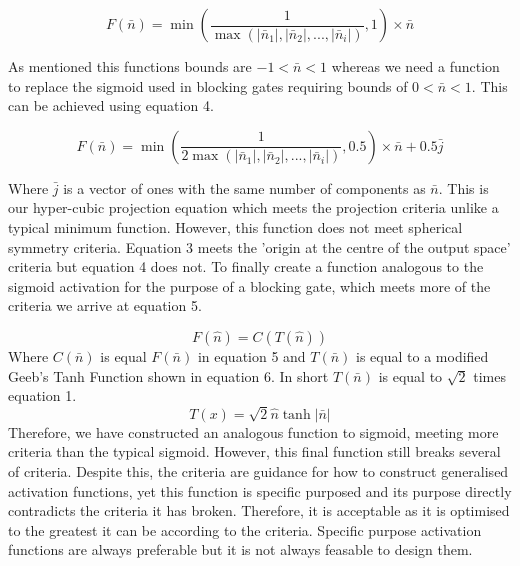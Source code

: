 \documentclass[onecolumn]{article}
\begin{document}
    \begin{equation}
        \label{eqn: Hyper-Cubic Projection Equation}
        F\left(\bar{n}\right)=\min\left(\frac{1}{\max\left(\left|\bar{n}_{1}\right|,\left|\bar{n}_{2}\right|,...,\left|\bar{n}_{i}\right|\right)},1\right)\times\bar{n}
    \end{equation}

    As mentioned this functions bounds are $-1<\bar{n}<1$ whereas we need a function to replace the sigmoid used in blocking gates requiring bounds of $0<\bar{n}<1$. This can be achieved using equation 4.
    
    \begin{equation}
        \label{eqn: Hyper-Cubic Projection Equation 2}
        F\left(\bar{n}\right)=\min\left(\frac{1}{2\max\left(\left|\bar{n}_{1}\right|,\left|\bar{n}_{2}\right|,...,\left|\bar{n}_{i}\right|\right)},0.5\right)\times\bar{n} + 0.5\bar{j}
    \end{equation}

    Where $\bar{j}$ is a vector of ones with the same number of components as $\bar{n}$. This is our hyper-cubic projection equation which meets the projection criteria unlike a typical minimum function. However, this function does not meet spherical symmetry criteria. Equation 3 meets the 'origin at the centre of the output space' criteria but equation 4 does not. To finally create a function analogous to the sigmoid activation for the purpose of a blocking gate, which meets more of the criteria we arrive at equation 5.
    
    \begin{equation}
        \label{eqn: Geeb's-Sigmoid}
        F(\hat{n}) = C(T(\hat{n}))
    \end{equation}
    Where $C(\bar{n})$ is equal $F(\bar{n})$ in equation 5 and $T(\bar{n})$ is equal to a modified Geeb's Tanh Function shown in equation 6. In short $T(\bar{n})$ is equal to $\sqrt{2}$ times equation 1.
    \begin{equation}
        \label{eqn: Geeb's-Sigmoid}
        T(x) = \sqrt{2}\hat{n}\tanh|\bar{n}|
    \end{equation}
    Therefore, we have constructed an analogous function to sigmoid, meeting more criteria than the typical sigmoid. However, this final function still breaks several of criteria. Despite this, the criteria are guidance for how to construct generalised activation functions, yet this function is specific purposed and its purpose directly contradicts the criteria it has broken. Therefore, it is acceptable as it is optimised to the greatest it can be according to the criteria. Specific purpose activation functions are always preferable but it is not always feasable to design them. 
\end{document}
